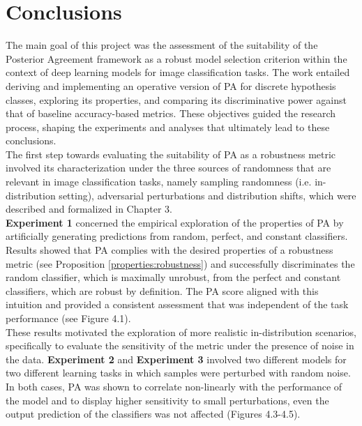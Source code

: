 \chapter{Conclusions}\label{sec:conclusions}

The main goal of this project was the assessment of the suitability of the Posterior Agreement framework 
as a robust model selection criterion within the context of deep learning models for image classification tasks. 
The work entailed deriving and implementing an operative version of PA for discrete hypothesis 
classes, exploring its properties, and comparing its discriminative power against that of baseline 
accuracy-based metrics. These objectives guided the research process, shaping the 
experiments and analyses that ultimately lead to these conclusions. \\


The first step towards evaluating the suitability of PA as a robustness metric involved
its characterization under the three sources of randomness that are relevant in image 
classification tasks, namely sampling randomness (i.e. in-distribution setting), adversarial perturbations 
and distribution shifts, which were described and formalized in Chapter 3. \\

\textbf{Experiment 1} concerned the empirical exploration of the properties of PA by artificially generating
predictions from random, perfect, and constant classifiers. Results showed that PA complies with the
desired properties of a robustness metric (see Proposition \ref{properties:robustness}) and successfully
discriminates the random classifier, which is maximally unrobust, from the perfect and constant classifiers, which
are robust by definition. The PA score aligned with this intuition and provided a consistent assessment that
was independent of the task performance (see Figure 4.1). \\ 

These results motivated the exploration of more realistic in-distribution scenarios, specifically to evaluate
the sensitivity of the metric under the presence of noise in the data. \textbf{Experiment 2} and \textbf{Experiment 3}
involved two different models for two different learning tasks in which samples were perturbed with random noise.
In both cases, PA was shown to correlate non-linearly with the performance of the model and to display higher sensitivity
to small perturbations, even the output prediction of the classifiers was not affected (Figures 4.3-4.5).\\

